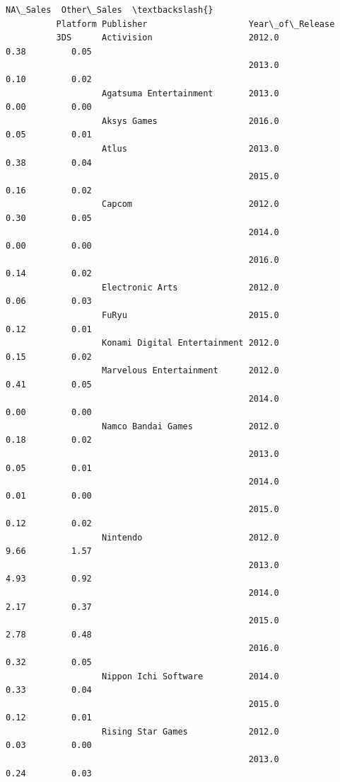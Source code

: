 \documentclass[11pt]{article}
\begin{document}
\begin{Verbatim}[commandchars=\\\{\}]
                                                                 NA\_Sales  Other\_Sales  \textbackslash{}
          Platform Publisher                    Year\_of\_Release                          
          3DS      Activision                   2012.0               0.38         0.05   
                                                2013.0               0.10         0.02   
                   Agatsuma Entertainment       2013.0               0.00         0.00   
                   Aksys Games                  2016.0               0.05         0.01   
                   Atlus                        2013.0               0.38         0.04   
                                                2015.0               0.16         0.02   
                   Capcom                       2012.0               0.30         0.05   
                                                2014.0               0.00         0.00   
                                                2016.0               0.14         0.02   
                   Electronic Arts              2012.0               0.06         0.03   
                   FuRyu                        2015.0               0.12         0.01   
                   Konami Digital Entertainment 2012.0               0.15         0.02   
                   Marvelous Entertainment      2012.0               0.41         0.05   
                                                2014.0               0.00         0.00   
                   Namco Bandai Games           2012.0               0.18         0.02   
                                                2013.0               0.05         0.01   
                                                2014.0               0.01         0.00   
                                                2015.0               0.12         0.02   
                   Nintendo                     2012.0               9.66         1.57   
                                                2013.0               4.93         0.92   
                                                2014.0               2.17         0.37   
                                                2015.0               2.78         0.48   
                                                2016.0               0.32         0.05   
                   Nippon Ichi Software         2014.0               0.33         0.04   
                                                2015.0               0.12         0.01   
                   Rising Star Games            2012.0               0.03         0.00   
                                                2013.0               0.24         0.03   

\end{Verbatim}
\end{document}
